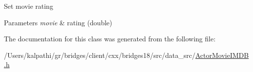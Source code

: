 Set movie rating


\begin{DoxyParams}{Parameters}
{\em movie} & rating (double) \\
\hline
\end{DoxyParams}


The documentation for this class was generated from the following file\+:\begin{DoxyCompactItemize}
\item 
/\+Users/kalpathi/gr/bridges/client/cxx/bridges18/src/data\+\_\+src/\mbox{\hyperlink{_actor_movie_i_m_d_b_8h}{Actor\+Movie\+I\+M\+D\+B.\+h}}\end{DoxyCompactItemize}
